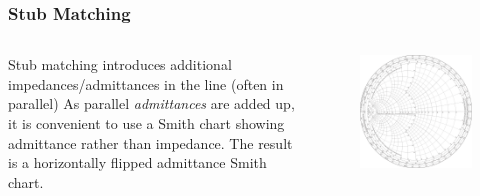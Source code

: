 \documentclass[10pt, compress]{beamer}
\begin{document}
\begin{frame}
    \frametitle{Stub Matching}
    \begin{columns}[T]
        \begin{column}[]{.4\textwidth}
            \begin{outline}
                \1 Stub matching introduces additional impedances/admittances in the line (often in parallel)
                \1 As parallel \textit{admittances} are added up, it is convenient to use a Smith chart showing admittance rather than impedance.
                \2 The result is a horizontally flipped admittance Smith chart.
            \end{outline}
        \end{column}
        \begin{column}[]{.6\textwidth}
            \begin{figure}[T!]
                \centering
                \includegraphics[width=.9\textwidth]{admittance.pdf}
            \end{figure}
        \end{column}
    \end{columns}
\end{frame}
\end{document}
